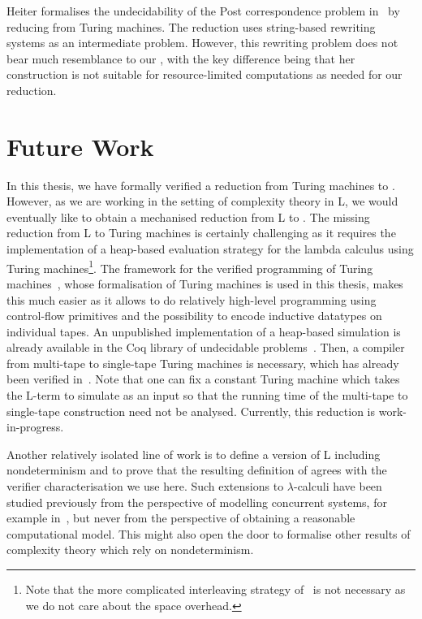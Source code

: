 Heiter formalises the undecidability of the Post correspondence problem in~\cite{heiter:pcp} by reducing from Turing machines. The reduction uses string-based rewriting systems as an intermediate problem. However, this rewriting problem does not bear much resemblance to our \PR{}, with the key difference being that her construction is not suitable for resource-limited computations as needed for our reduction.

\section{Future Work}
In this thesis, we have formally verified a reduction from Turing machines to \SAT{}. However, as we are working in the setting of complexity theory in L, we would eventually like to obtain a mechanised reduction from L to \SAT{}.
The missing reduction from L to Turing machines is certainly challenging as it requires the implementation of a heap-based evaluation strategy for the lambda calculus using Turing machines\footnote{Note that the more complicated interleaving strategy of~\cite{ForsterKunzeRoth:2019:wcbv-Reasonable} is not necessary as we do not care about the space overhead.}. The framework for the verified programming of Turing machines~\cite{ForsterEtAl:2019:VerifiedTMs}, whose formalisation of Turing machines is used in this thesis, makes this much easier as it allows to do relatively high-level programming using control-flow primitives and the possibility to encode inductive datatypes on individual tapes. An unpublished implementation of a heap-based simulation is already available in the Coq library of undecidable problems~\cite{coq_undec}. 
Then, a compiler from multi-tape to single-tape Turing machines is necessary, which has already been verified in~\cite{ForsterEtAl:2019:VerifiedTMs}. Note that one can fix a constant Turing machine which takes the L-term to simulate as an input so that the running time of the multi-tape to single-tape construction need not be analysed.
Currently, this reduction is work-in-progress.

Another relatively isolated line of work is to define a version of L including nondeterminism and to prove that the resulting definition of \NP{} agrees with the verifier characterisation we use here. Such extensions to $\lambda$-calculi have been studied previously from the perspective of modelling concurrent systems, for example in~\cite{kutzner:nondet_lambda}, but never from the perspective of obtaining a reasonable computational model. This might also open the door to formalise other results of complexity theory which rely on nondeterminism.

